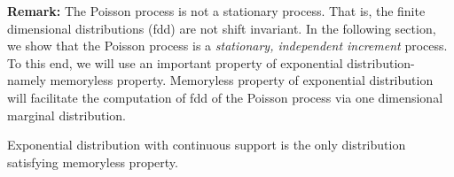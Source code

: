 \documentclass[a4paper,10pt]{article}
\begin{document}
\textbf{Remark:} The Poisson process is not a stationary process. That is, the finite dimensional distributions (fdd) are not shift invariant. In the following section, we show that the Poisson process is a \textit{stationary,  independent increment} process. To this end, we will use an important property of exponential distribution- namely memoryless property. Memoryless property of exponential distribution will facilitate the computation of fdd of the Poisson process via one dimensional marginal distribution. 

\begin{prop} Exponential distribution with  continuous support is the only distribution satisfying memoryless property.
\end{prop}

%
%
%
%
\end{document}
